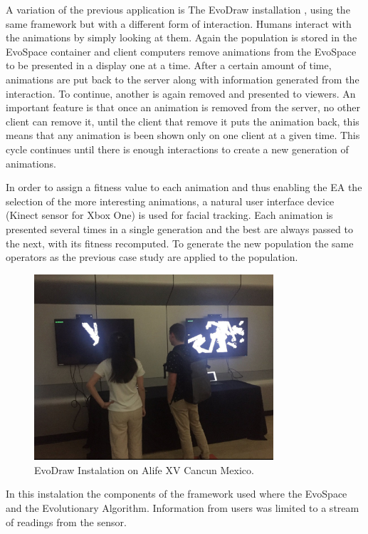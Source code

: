 A variation of the previous application is The EvoDraw installation , using the same
framework but with a different form of interaction. Humans interact with the animations 
by simply looking at them. Again the population is stored in the EvoSpace container and
client computers remove animations from the EvoSpace to be presented in a display one at a time. 
After a certain amount of time,  animations are put back to the server along with information 
generated from the interaction. To continue, another is again removed and presented to viewers. 
An important feature is that once an animation is removed from the server, no other client can remove it, 
until the client that remove it puts the animation back, this means that any
animation is been shown only on one client at a given time. This cycle continues until there
is enough interactions to create a new generation of animations. 

In order to assign a fitness value to each animation and thus enabling the EA the selection of the more interesting animations, a natural user interface device (Kinect sensor for Xbox One)
is used for facial tracking. Each animation is 
presented several times in a single generation and the best are always passed to the next, 
with its fitness recomputed. To generate the new population the same operators as the previous case study
are applied to the population. 

\begin{figure}[!t]
    \centering
        \includegraphics[width=3.5in]{img/kinect.png}
    \caption{EvoDraw Instalation on Alife XV Cancun Mexico.}
    \label{fig:kinect}
\end{figure}

In this instalation the components of the framework used where the EvoSpace and the Evolutionary Algorithm.
Information from users was limited to a stream of readings from the sensor.

